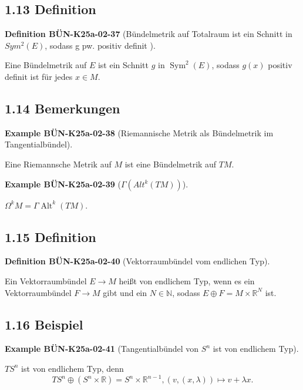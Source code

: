 \documentclass[10pt, letterpaper]{article}
\newcommand{\CustomHeading}[3]{%
  \par\medskip\noindent%
  \textbf{#1 #2} \textnormal{(#3)}.\enskip%
}
\newenvironment{DEF}[2]{\begin{unitbox}\CustomHeading{Definition}{#1}{#2}}{\end{unitbox}}
\newenvironment{EXA}[2]{\begin{unitbox}\CustomHeading{Example}{#1}{#2}}{\end{unitbox}}
\begin{document}
\subsection*{1.13 Definition}


\begin{DEF}{BÜN-K25a-02-37}{Bündelmetrik auf Totalraum ist ein Schnitt in $Sym^2(E)$, sodass g pw. positiv definit }
Eine Bündelmetrik auf $E$ ist ein Schnitt $g$ in $\operatorname{Sym}^{2}(E)$, sodass $g(x)$ positiv definit ist für jedes $x \in M$.
\end{DEF}

\subsection*{1.14 Bemerkungen}

\begin{EXA}{BÜN-K25a-02-38}{Riemannische Metrik als Bündelmetrik im Tangentialbündel}
Eine Riemannsche Metrik auf $M$ ist eine Bündelmetrik auf $T M$.
\end{EXA}


\begin{EXA}{BÜN-K25a-02-39}{$\Gamma (Alt^k(TM))$}
$\Omega^{k} M=\Gamma \operatorname{Alt}^{k}(T M)$.
\end{EXA}



\subsection*{1.15 Definition}

\begin{DEF}{BÜN-K25a-02-40}{Vektorraumbündel vom endlichen Typ}
Ein Vektorraumbündel $E \rightarrow M$ heißt von endlichem Typ, wenn es ein Vektorraumbündel $F \rightarrow M$ gibt und ein $N \in \mathbb{N}$, sodass $E \oplus F=M \times \mathbb{R}^{N}$ ist.
\end{DEF}


\subsection*{1.16 Beispiel}

\begin{EXA}{BÜN-K25a-02-41}{Tangentialbündel von $S^n$ ist von endlichem Typ}
$T S^{n}$ ist von endlichem Typ, denn
$$
T S^{n} \oplus\left(S^{n} \times \mathbb{R}\right)=S^{n} \times \mathbb{R}^{n-1},(v,(x, \lambda)) \mapsto v+\lambda x .
$$
\end{EXA}
\end{document}
